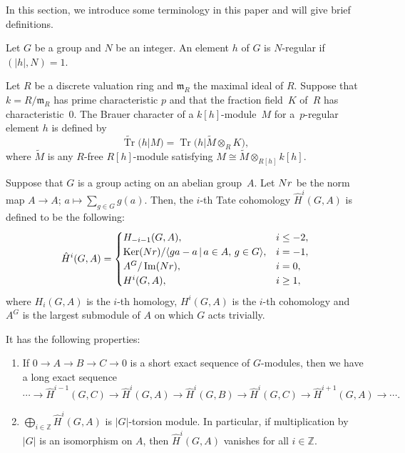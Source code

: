 \documentclass[11pt]{article}
\numberwithin{equation}{section}
\numberwithin{equation}{section}
\begin{document}
 In this section, we introduce some terminology in this paper and will give brief definitions.

\setcounter{Theorem}{4}
\begin{Definition}
Let $G$ be a group and $N$ be an integer. An element $h$ of $G$ is $N$-regular if $(|h|,N)=1$.
\end{Definition}

\begin{Definition}
Let $R$ be a discrete valuation ring and $\mathfrak{m}_R$ the maximal ideal of $R$. Suppose that $k=R/\mathfrak{m}_R$ has prime characteristic $p$ and that the fraction field~$K$ of~$R$ has characteristic~$0$. The Brauer character of a $k[h]$-module~$M$ for a~$p$-regular element $h$ is defined by
\[
\widetilde{\operatorname{Tr}}(h|M)=\operatorname{Tr}\big(h|\widetilde{M}\otimes_RK\big),
\]
 where $\widetilde{M}$ is any $R$-free $R[h]$-module satisfying $M\cong\widetilde{M}\otimes_{R[h]}k[h]$.
\end{Definition}

\begin{Definition}[{\cite[Chapter IV]{CF}}]\label{Tate}
Suppose that $G$ is a group acting on an abelian group~$A$. Let ${\rm Nr}$ be the norm map $A\rightarrow A$; $a\mapsto\sum_{g\in G}{g(a)}$. Then, the $i$-th Tate cohomology ${\hat{H}}^i(G,A)$ is defined to be the following:
 \[
{\hat{H}}^i(G,A)= \begin{cases}
H_{-i-1}(G,A), & i\leq-2, \\
\operatorname{Ker}({\rm Nr})/\langle ga-a\,|\,a \in A, \, g\in G\rangle, & i=-1, \\
A^G/\operatorname{Im}({\rm Nr}), & i=0, \\
H^i(G,A), & i \geq1,
 \end{cases}
 \]
where $H_i(G,A)$ is the $i$-th homology, $H^i(G,A)$ is the $i$-th cohomology and $A^G$ is the largest submodule of $A$ on which $G$ acts trivially.
\end{Definition}

It has the following properties:
\begin{enumerate}\itemsep=0pt
\item[(1)] If $0\rightarrow A \rightarrow B \rightarrow C \rightarrow 0$ is a short exact sequence of $G$-modules, then we have a long exact sequence
\[
\cdots \rightarrow {\hat{H}}^{i-1}(G,C)\rightarrow {\hat{H}}^{i}(G,A)\rightarrow {\hat{H}}^{i}(G,B)\rightarrow {\hat{H}}^{i}(G,C)\rightarrow {\hat{H}}^{i+1}(G,A) \rightarrow \cdots.
\]
\item[(2)] $\bigoplus_{i\in \mathbb{Z}}{\hat{H}}^i(G,A)$ is $ |G |$-torsion module. In particular, if multiplication by $|G|$ is an isomorphism on $A$, then $\hat{H}^i(G,A)$ vanishes for all $i\in \mathbb{Z}$.
\end{enumerate}
\end{document}
